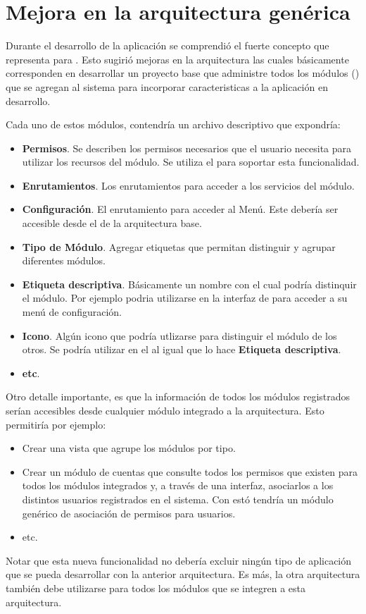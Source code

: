
\section{Mejora en la arquitectura genérica}
	Durante el desarrollo de la aplicación se comprendió el fuerte concepto que representa \packageAS para \meteorNAME. Esto sugirió mejoras en la arquitectura las cuales básicamente corresponden en desarrollar un proyecto base que administre todos los módulos (\packageAS) que se agregan al sistema para incorporar caracteristicas a la aplicación en desarrollo. 

	Cada uno de estos módulos, contendría un archivo descriptivo que expondría:
	\begin{itemize}
		\item
			\textbf{Permisos}. Se describen los permisos necesarios que el usuario necesita para utilizar los recursos del módulo. Se utiliza el \packageAS \alanningRolesPackage para soportar esta funcionalidad.
		\item
			\textbf{Enrutamientos}. Los enrutamientos para acceder a los servicios del módulo.
		\item
			\textbf{Configuración}. El enrutamiento para acceder al Menú. Este debería ser accesible desde el \dashboardEF  de la arquitectura base.
		\item
			\textbf{Tipo de Módulo}. Agregar etiquetas que permitan distinguir y agrupar diferentes módulos.
		\item
			\textbf{Etiqueta descriptiva}. Básicamente un nombre con el cual podría distinquir el módulo. Por ejemplo podria utilizarse en la interfaz de \dashboardEF para acceder a su menú de configuración.
		\item
			\textbf{Icono}. Algún icono que podría utlizarse para distinguir el módulo de los otros. Se podría utilizar en el \dashboardEF al igual que lo hace \textbf{Etiqueta descriptiva}.
		\item
			\textbf{etc}.
	\end{itemize}


	Otro detalle importante, es que la información de todos los módulos registrados serían accesibles desde cualquier módulo integrado a la arquitectura. Esto permitiría por ejemplo:

	\begin{itemize}
		\item
			Crear una vista que agrupe los módulos por tipo.
		\item
			Crear un módulo de cuentas que consulte todos los permisos que existen para todos los módulos integrados y, a través de una interfaz, asociarlos a los distintos usuarios registrados en el sistema. Con estó tendría un módulo genérico de asociación de permisos para usuarios.
		\item
			etc.
	\end{itemize}

	Notar que esta nueva funcionalidad no debería excluir ningún tipo de aplicación que se pueda desarrollar con la anterior arquitectura. Es más, la otra arquitectura también debe utilizarse para todos los módulos que se integren a esta arquitectura.


